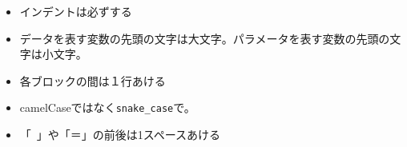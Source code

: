 \begin{itemize}
	\item インデントは必ずする
	\item データを表す変数の先頭の文字は大文字。パラメータを表す変数の先頭の文字は小文字。
	\item 各ブロックの間は１行あける
	\item camelCaseではなく\verb|snake_case|で。
	\item 「~」や「＝」の前後は1スペースあける
\end{itemize}
